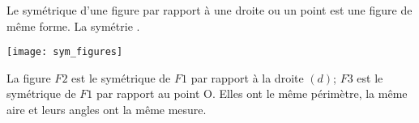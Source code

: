 \begin{myprop}
	Le symétrique d'une figure par rapport à une droite ou un point est une figure de même forme. La symétrie .
\end{myprop}

\begin{myex}
	\begin{center}
		\texttt{[image: sym\_figures]}
	\end{center}
	
	La figure $F2$ est le symétrique de $F1$ par rapport à la droite $(d)$; $F3$ est le symétrique de $F1$ par rapport au point O.
	Elles ont le même périmètre, la même aire et leurs angles ont la même mesure.
\end{myex}

